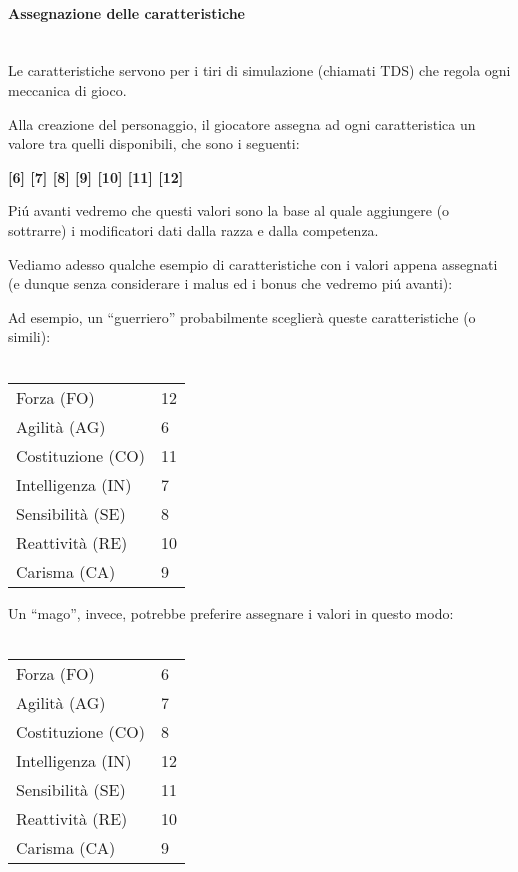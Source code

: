 \documentclass[../manuale_main.tex]{subfiles}
\begin{document}
\clearpage
\paragraph{Assegnazione delle caratteristiche}\mbox{}\\
Le caratteristiche servono per i tiri di simulazione (chiamati TDS) che regola ogni meccanica di gioco.

Alla creazione del personaggio, il giocatore assegna ad ogni caratteristica un valore tra quelli disponibili, che sono i seguenti: 

\textbf{[6] [7] [8] [9] [10] [11] [12]}

Piú avanti vedremo che questi valori sono la base al quale aggiungere (o sottrarre) i modificatori dati dalla razza e dalla competenza.



Vediamo adesso qualche esempio di caratteristiche con i valori appena assegnati (e dunque senza considerare i malus ed i bonus che vedremo piú avanti):

Ad esempio, un ``guerriero'' probabilmente sceglierà queste caratteristiche (o simili):\\\mbox{}\\
\renewcommand{\arraystretch}{1.2}
\begin{tabular}{| l | l |}
\hline
Forza (FO)&12\\
Agilità (AG)&6\\
Costituzione (CO)&11\\
Intelligenza (IN)&7\\
Sensibilità (SE)&8\\
Reattività (RE)&10\\
Carisma (CA)&9\\
\hline
\end{tabular}

Un ``mago'', invece, potrebbe preferire assegnare i valori in questo modo:\\\mbox{}\\
\begin{tabular}{| l |l |}
\hline
Forza (FO)&6\\
Agilità (AG)&7\\
Costituzione (CO)&8\\
Intelligenza (IN)&12\\
Sensibilità (SE)&11\\
Reattività (RE)&10\\
Carisma (CA)&9\\
\hline
\end{tabular}
\end{document}

